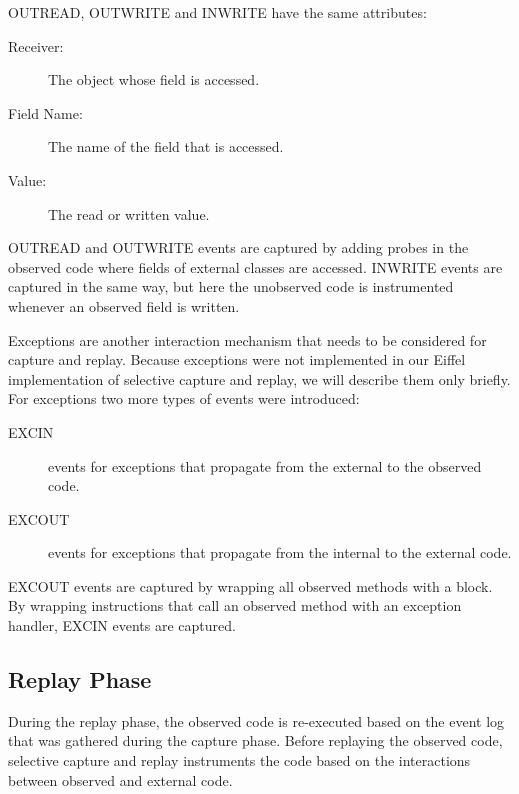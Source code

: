 OUTREAD, OUTWRITE and INWRITE have the same attributes:

\begin{description}
 \item [Receiver:] The object whose field is accessed.
 \item [Field Name:] The name of the field that is accessed.
 \item [Value:] The read or written value.
\end{description}

OUTREAD and OUTWRITE events are captured by adding probes in the observed code where fields of external classes are accessed. INWRITE events are captured in the same way, but here the unobserved code is instrumented whenever an observed field is written. 

Exceptions are another interaction mechanism that needs to be considered for capture and replay. Because exceptions were not implemented in our Eiffel implementation of selective capture and replay, we will describe them only briefly. For exceptions two more types of events were introduced:
\begin{description}
 \item [EXCIN] events for exceptions that propagate from the external to the observed code.
 \item [EXCOUT] events for exceptions that propagate from the internal to the external code.
\end{description}
EXCOUT events are captured by wrapping all observed methods with a  block. By wrapping instructions that call an observed method with an exception handler,  EXCIN events are captured.

\subsection{Replay Phase}
During the replay phase, the observed code is re-executed based on the event log that was gathered during the capture phase. Before replaying the observed code, selective capture and replay instruments the code based on the interactions between observed and external code. 

